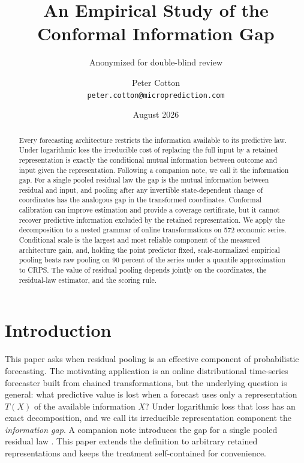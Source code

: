 \documentclass[11pt]{article}
\title{An Empirical Study of the Conformal Information Gap}
\author{Anonymized for double-blind review}
\author{Peter Cotton\\\texttt{peter.cotton@microprediction.com}}
\date{August 2026}
\theoremstyle{remark}
\newif\ifanon
\begin{document}
\maketitle

\begin{abstract}
Every forecasting architecture restricts the information available to its predictive law.
Under logarithmic loss the irreducible cost of replacing the full input by a retained
representation is exactly the conditional mutual information between outcome and input given
the representation. Following a companion note, we call it the information gap. For a single pooled residual law the gap
is the mutual information between residual and input, and pooling after any invertible
state-dependent change of coordinates has the analogous gap in the transformed coordinates.
Conformal calibration can improve estimation and provide a coverage certificate, but it
cannot recover predictive information excluded by the retained representation. We apply the decomposition to a
nested grammar of online transformations on 572 economic series. Conditional scale is the
largest and most reliable component of the measured architecture gain, and, holding the point
predictor fixed, scale-normalized empirical pooling beats raw pooling on 90 percent of the
series under a quantile approximation to CRPS. The value of residual pooling depends jointly
on the coordinates, the residual-law estimator, and the scoring rule.
\end{abstract}

\section{Introduction}\label{sec:intro}

This paper asks when residual pooling is an effective component of probabilistic
forecasting. The motivating application is an online distributional time-series forecaster
built from chained transformations, but the underlying question is general: what predictive
value is lost when a forecast uses only a representation $T(X)$ of the available information
$X$? Under logarithmic loss that loss has an exact decomposition, and we call its irreducible
representation component the \emph{information gap}. \ifanon A recent note, blinded for
review, introduces the gap for a single pooled residual law. \else A companion note
introduces the gap for a single pooled residual law \citep{cotton2026marginally}. \fi This
paper extends the definition to arbitrary retained representations and keeps the treatment
self-contained for convenience.
\end{document}
